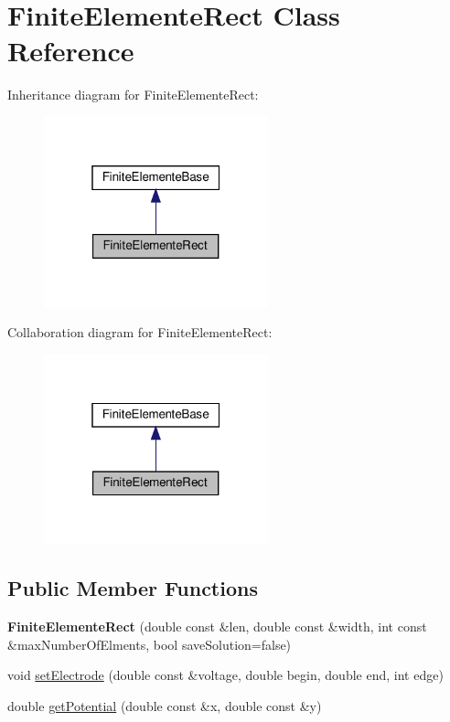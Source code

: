 \hypertarget{classFiniteElementeRect}{}\section{Finite\+Elemente\+Rect Class Reference}
\label{classFiniteElementeRect}


Inheritance diagram for Finite\+Elemente\+Rect\+:\nopagebreak
\begin{figure}[H]
\begin{center}
\leavevmode
\includegraphics[width=184pt]{classFiniteElementeRect__inherit__graph}
\end{center}
\end{figure}


Collaboration diagram for Finite\+Elemente\+Rect\+:\nopagebreak
\begin{figure}[H]
\begin{center}
\leavevmode
\includegraphics[width=184pt]{classFiniteElementeRect__coll__graph}
\end{center}
\end{figure}
\subsection*{Public Member Functions}
\begin{DoxyCompactItemize}
\item 
\mbox{\label{classFiniteElementeRect_a5731bd88a8d13f73635015294042ab46}} 
{\bfseries Finite\+Elemente\+Rect} (double const \&len, double const \&width, int const \&max\+Number\+Of\+Elments, bool save\+Solution=false)
\item 
void \hyperlink{classFiniteElementeRect_a1b0c2fd8cc32d3bc9a23931f86b09406}{set\+Electrode} (double const \&voltage, double begin, double end, int edge)
\item 
double \hyperlink{classFiniteElementeRect_acbfa1b0263e192b4b7da51a486b623cf}{get\+Potential} (double const \&x, double const \&y)
\end{DoxyCompactItemize}
